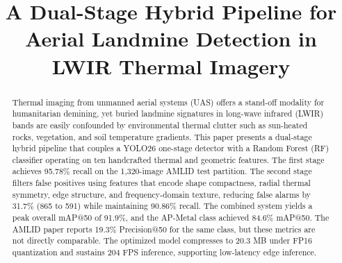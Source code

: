 \documentclass[conference]{IEEEtran}
\begin{document}
\title{A Dual-Stage Hybrid Pipeline for Aerial Landmine Detection in LWIR Thermal Imagery}

\author{
  \and
  \and
  \and
}

\maketitle

\begin{abstract}
Thermal imaging from unmanned aerial systems (UAS) offers a stand-off modality for humanitarian demining, yet buried landmine signatures in long-wave infrared (LWIR) bands are easily confounded by environmental thermal clutter such as sun-heated rocks, vegetation, and soil temperature gradients. This paper presents a dual-stage hybrid pipeline that couples a YOLO26 one-stage detector with a Random Forest (RF) classifier operating on ten handcrafted thermal and geometric features. The first stage achieves 95.78\% recall on the 1,320-image AMLID test partition. The second stage filters false positives using features that encode shape compactness, radial thermal symmetry, edge structure, and frequency-domain texture, reducing false alarms by 31.7\% (865 to 591) while maintaining 90.86\% recall. The combined system yields a peak overall mAP@50 of 91.9\%, and the AP-Metal class achieved 84.6\% mAP@50. The AMLID paper reports 19.3\% Precision@50 for the same class, but these metrics are not directly comparable. The optimized model compresses to 20.3 MB under FP16 quantization and sustains 204 FPS inference, supporting low-latency edge inference.
\end{abstract}
\end{document}
